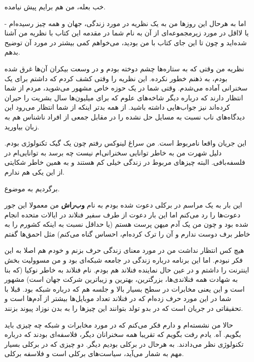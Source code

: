 خب بعله، من هم برایم پیش نیامده.

اما به هرحال این روزها من به یک نظریه در مورد زندگی، جهان و همه چیز
رسیده‌ام - یا لااقل در مورد زیرمجموعه‌ای از آن به نام 
شما در مقدمه این کتاب با نظریه من آشنا شده‌اید و چون تا این جای کتاب با
من بودید، می‌خواهم کمی بیشتر در مورد آن توضیح بدهم.

نظریه من وقتی که به ستاره‌ها چشم دوخته بودم و در وسعت بیکران آن‌ها غرق
شده بودم، به ذهنم خطور نکرده. این نظریه را وقتی کشف کردم که داشتم برای
یک سخنرانی آماده می‌شدم. وقتی شما در یک حوزه خاص مشهور می‌شوید، مردم از
شما انتظار دارند که درباره دیگر شاخه‌های علوم که برای میلیون‌ها سال
بشریت را حیران کرده‌اند نیز جواب‌هایی داشته باشید. از همه بدتر اینکه از
شما انتظار می‌رود این دیدگاه‌های ناب نسبت به مسایل حل نشده را در مقابل
جمعی از افراد ناشناس هم به زبان بیاورید.

این جریان واقعا نامربوط است. من سراغ لینوکس رفتم چون یک گیک تکنولوژی
بودم. دلیل شهرت من به خاطر توانایی سخنرانی‌ام نیست چه برسد به توانایی‌ام
در فلسفه‌بافی. البته چیزهای مربوط در زندگی خیلی کم هستند و به همین خاطر
شکایتی از این یکی هم ندارم.

برگردیم به موضوع.

این بار به یک مراسم در برکلی دعوت شده بودم به نام
\textbf{وب‌راش} من معمولا این جور دعوت‌ها را رد می‌کنم
اما این بار دعوت از طرف سفیر فنلاند در ایالات متحده انجام شده بود و
چون من یک آدم میهن پرست هستم (یا حداقل نسبت به اینکه کشورم را به خاطر
برف دوست ندارم و آن را ترک کرده‌ام، احساس گناه می‌کنم) مثل احمق‌ها گفتم

هیچ کس انتظار نداشت من در مورد معنای زندگی حرف بزنم و خودم هم اصلا به
این فکر نبودم. اما این برنامه درباره زندگی در جامعه شبکه‌ای بود و من
مسوولیت بخش اینترنت را داشتم و در عین حال نماینده فنلاند هم بودم. نام
فنلاند به خاطر نوکیا (که بنا به شهادت همه فنلاندی‌ها، بزرگترین، بهترین
و زیباترین شرکت جهان است) مشهور است و این یعنی مخابرات در سطح بسیار
بالا و جلسه هم که درباره شبکه بود. قبلا با شما در این مورد حرف زده‌ام
که در فنلاند تعداد موبایل‌ها بیشتر از آدم‌ها است و تحقیقاتی در جریان است
که در بدو تولد بتوانند این چیزها را به بدن نوزاد پیوند بزنند.

حالا من نشسته‌ام و دارم فکر می‌کنم که در مورد مخابرات و شبکه چه چیزی
باید بگویم. آه. یادم رفت بگویم که تقریبا همه سخنرانان دیگر، فلاسفه‌ای
بودند که درباره تکنولوژی نظر می‌دادند. به هرحال در برکلی بودیم دیگر. دو
چیزی که در برکلی بسیار مهم به شمار می‌آید، سیاست‌های برکلی‌ است و فلاسفه
برکلی.

